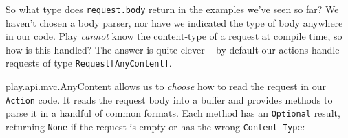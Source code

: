 \documentclass[oneside,11pt,a4paper,]{book}
\begin{document}
So what type does \texttt{request.body} return in the examples we've
seen so far? We haven't chosen a body parser, nor have we indicated the
type of body anywhere in our code. Play \emph{cannot} know the
content-type of a request at compile time, so how is this handled? The
answer is quite clever -- by default our actions handle requests of type
\texttt{Request{[}AnyContent{]}}.

\href{https://www.playframework.com/documentation/2.3.x/api/scala/index.html\#play.api.mvc.AnyContent}{play.api.mvc.AnyContent}
allows us to \emph{choose} how to read the request in our
\texttt{Action} code. It reads the request body into a buffer and
provides methods to parse it in a handful of common formats. Each method
has an \texttt{Optional} result, returning \texttt{None} if the request
is empty or has the wrong \texttt{Content-Type}:
\end{document}

